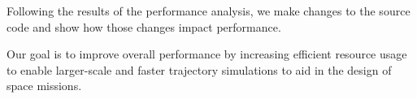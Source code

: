 Following the results of the performance analysis, we make changes to the source code and show how those changes impact performance.

Our goal is to improve overall performance by increasing efficient resource usage to enable larger-scale and faster trajectory simulations to aid in the design of space missions.


